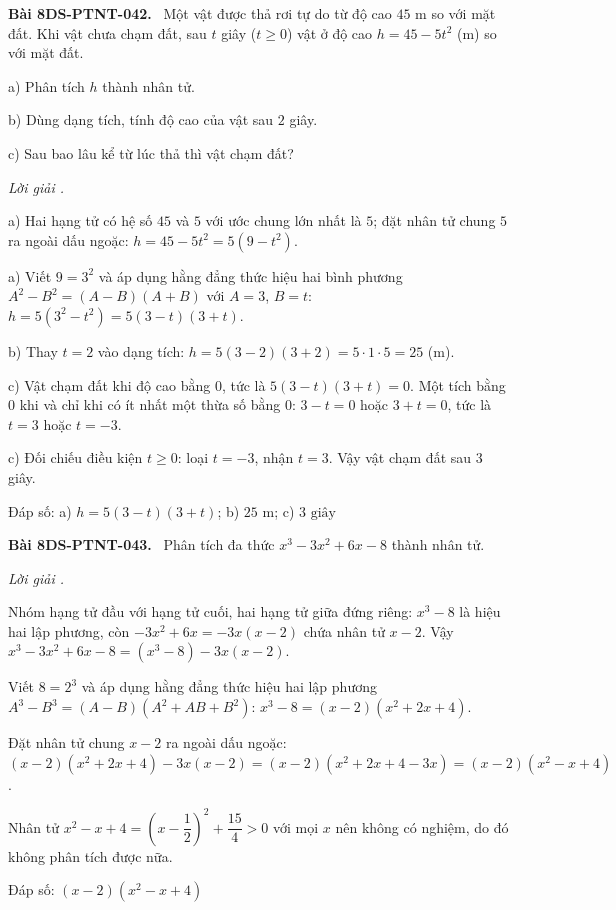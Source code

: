 \documentclass[12pt,a4paper]{article}
\newenvironment{problem}[1][]{\par\medskip\noindent\textbf{Bài #1.}\ }{\par}
\newenvironment{solution}[1][]{\par\noindent\textit{Lời giải #1.}\par}{\par}
\begin{document}
\begin{problem}[8DS-PTNT-042]
Một vật được thả rơi tự do từ độ cao $45$ m so với mặt đất. Khi vật chưa chạm đất, sau $t$ giây ($t \geq 0$) vật ở độ cao $h = 45 - 5t^2$ (m) so với mặt đất.

a) Phân tích $h$ thành nhân tử.

b) Dùng dạng tích, tính độ cao của vật sau $2$ giây.

c) Sau bao lâu kể từ lúc thả thì vật chạm đất?

\begin{solution}
a) Hai hạng tử có hệ số $45$ và $5$ với ước chung lớn nhất là $5$; đặt nhân tử chung $5$ ra ngoài dấu ngoặc: $h = 45 - 5t^2 = 5(9 - t^2)$.

a) Viết $9 = 3^2$ và áp dụng hằng đẳng thức hiệu hai bình phương $A^2 - B^2 = (A - B)(A + B)$ với $A = 3$, $B = t$: $h = 5(3^2 - t^2) = 5(3 - t)(3 + t)$.

b) Thay $t = 2$ vào dạng tích: $h = 5(3 - 2)(3 + 2) = 5 \cdot 1 \cdot 5 = 25$ (m).

c) Vật chạm đất khi độ cao bằng $0$, tức là $5(3 - t)(3 + t) = 0$. Một tích bằng $0$ khi và chỉ khi có ít nhất một thừa số bằng $0$: $3 - t = 0$ hoặc $3 + t = 0$, tức là $t = 3$ hoặc $t = -3$.

c) Đối chiếu điều kiện $t \geq 0$: loại $t = -3$, nhận $t = 3$. Vậy vật chạm đất sau $3$ giây.

Đáp số: a) $\boxed{h = 5(3 - t)(3 + t)}$; b) $\boxed{25 \text{ m}}$; c) $\boxed{3 \text{ giây}}$
\end{solution}
\end{problem}

\begin{problem}[8DS-PTNT-043]
Phân tích đa thức $x^3 - 3x^2 + 6x - 8$ thành nhân tử.

\begin{solution}
Nhóm hạng tử đầu với hạng tử cuối, hai hạng tử giữa đứng riêng: $x^3 - 8$ là hiệu hai lập phương, còn $-3x^2 + 6x = -3x(x - 2)$ chứa nhân tử $x - 2$. Vậy $x^3 - 3x^2 + 6x - 8 = (x^3 - 8) - 3x(x - 2)$.

Viết $8 = 2^3$ và áp dụng hằng đẳng thức hiệu hai lập phương $A^3 - B^3 = (A - B)(A^2 + AB + B^2)$: $x^3 - 8 = (x - 2)(x^2 + 2x + 4)$.

Đặt nhân tử chung $x - 2$ ra ngoài dấu ngoặc: $(x - 2)(x^2 + 2x + 4) - 3x(x - 2) = (x - 2)(x^2 + 2x + 4 - 3x) = (x - 2)(x^2 - x + 4)$.

Nhân tử $x^2 - x + 4 = \left(x - \dfrac{1}{2}\right)^2 + \dfrac{15}{4} > 0$ với mọi $x$ nên không có nghiệm, do đó không phân tích được nữa.

Đáp số: $\boxed{(x - 2)(x^2 - x + 4)}$
\end{solution}
\end{problem}
\end{document}
